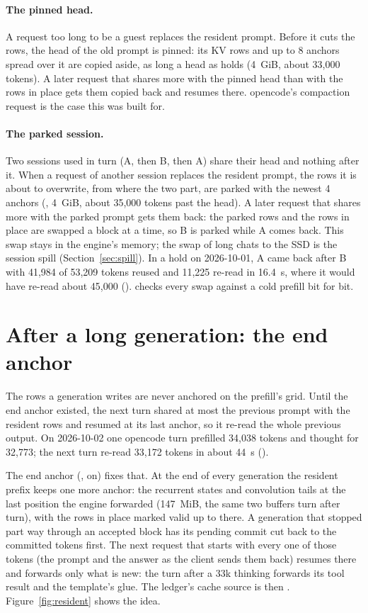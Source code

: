 \paragraph{The pinned head.} A request too long to be a guest replaces the resident prompt. Before it cuts the rows, the head of the old prompt is pinned: its KV rows and up to 8 anchors spread over it are copied aside, as long a head as  holds (4~GiB, about 33,000 tokens). A later request that shares more with the pinned head than with the rows in place gets them copied back and resumes there. opencode's compaction request is the case this was built for.

\paragraph{The parked session.} Two sessions used in turn (A, then B, then A) share their head and nothing after it. When a request of another session replaces the resident prompt, the rows it is about to overwrite, from where the two part, are parked with the newest 4 anchors (, 4~GiB, about 35,000 tokens past the head). A later request that shares more with the parked prompt gets them back: the parked rows and the rows in place are swapped a block at a time, so B is parked while A comes back. This swap stays in the engine's memory; the swap of long chats to the SSD is the session spill (Section~\ref{sec:spill}). In a hold on 2026-10-01, A came back after B with 41,984 of 53,209 tokens reused and 11,225 re-read in 16.4~s, where it would have re-read about 45,000 (\measured).  checks every swap against a cold prefill bit for bit.

\section{After a long generation: the end anchor}\label{sec:end-anchor}

The rows a generation writes are never anchored on the prefill's grid. Until the end anchor existed, the next turn shared at most the previous prompt with the resident rows and resumed at its last anchor, so it re-read the whole previous output. On 2026-10-02 one opencode turn prefilled 34,038 tokens and thought for 32,773; the next turn re-read 33,172 tokens in about 44~s (\measured).

The end anchor (, on) fixes that. At the end of every generation the resident prefix keeps one more anchor: the recurrent states and convolution tails at the last position the engine forwarded (147~MiB, the same two buffers turn after turn), with the rows in place marked valid up to there. A generation that stopped part way through an accepted block has its pending commit cut back to the committed tokens first. The next request that starts with every one of those tokens (the prompt and the answer as the client sends them back) resumes there and forwards only what is new: the turn after a 33k thinking forwards its tool result and the template's glue. The ledger's cache source is then . Figure~\ref{fig:resident} shows the idea.

